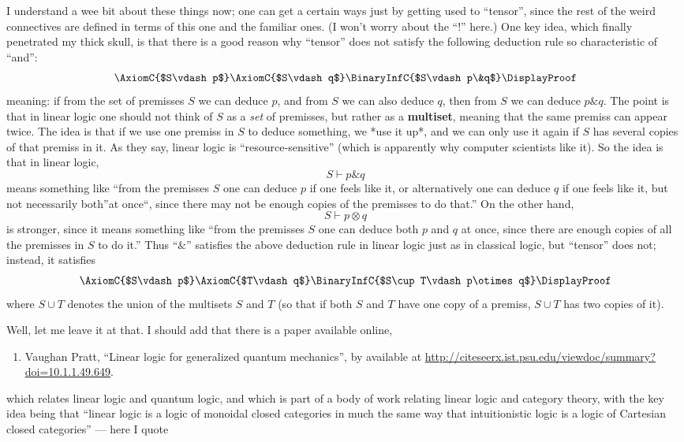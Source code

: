 \documentclass[12pt]{article}
\def\tightlist{}
\begin{document}
I understand a wee bit about these things now; one can get a certain
ways just by getting used to ``tensor'', since the rest of the weird
connectives are defined in terms of this one and the familiar ones. (I
won't worry about the ``\(!\)'' here.) One key idea, which finally
penetrated my thick skull, is that there is a good reason why ``tensor''
does not satisfy the following deduction rule so characteristic of
``and'':
\[\AxiomC{$S\vdash p$}\AxiomC{$S\vdash q$}\BinaryInfC{$S\vdash p\&q$}\DisplayProof\]
meaning: if from the set of premisses \(S\) we can deduce \(p\), and
from \(S\) we can also deduce \(q\), then from \(S\) we can deduce
\(p\&q\). The point is that in linear logic one should not think of
\(S\) as a \emph{set} of premisses, but rather as a \textbf{multiset},
meaning that the same premiss can appear twice. The idea is that if we
use one premiss in \(S\) to deduce something, we *use it up*, and we can
only use it again if \(S\) has several copies of that premiss in it. As
they say, linear logic is ``resource-sensitive'' (which is apparently
why computer scientists like it). So the idea is that in linear logic,
\[S\vdash p\&q\] means something like ``from the premisses \(S\) one can
deduce \(p\) if one feels like it, or alternatively one can deduce \(q\)
if one feels like it, but not necessarily both''at once``, since there
may not be enough copies of the premisses to do that.'' On the other
hand, \[S\vdash p\otimes q\] is stronger, since it means something like
``from the premisses \(S\) one can deduce both \(p\) and \(q\) at once,
since there are enough copies of all the premisses in \(S\) to do it.''
Thus ``\(\&\)'' satisfies the above deduction rule in linear logic just
as in classical logic, but ``tensor'' does not; instead, it satisfies
\[\AxiomC{$S\vdash p$}\AxiomC{$T\vdash q$}\BinaryInfC{$S\cup T\vdash p\otimes q$}\DisplayProof\]
where \(S \cup T\) denotes the union of the multisets \(S\) and \(T\)
(so that if both \(S\) and \(T\) have one copy of a premiss,
\(S \cup T\) has two copies of it).

Well, let me leave it at that. I should add that there is a paper
available online,

\begin{enumerate}
\def\labelenumi{\arabic{enumi})}
\setcounter{enumi}{1}
\tightlist
\item
 Vaughan Pratt, ``Linear logic for generalized quantum mechanics'', by 
  available at \href{http://citeseerx.ist.psu.edu/viewdoc/summary?doi=10.1.1.49.649}{http://citeseerx.ist.psu.edu/viewdoc/summary?doi=10.1.1.49.649}.
\end{enumerate}
\noindent
which relates linear logic and quantum logic, and which is part of a
body of work relating linear logic and category theory, with the key
idea being that ``linear logic is a logic of monoidal closed categories
in much the same way that intuitionistic logic is a logic of Cartesian
closed categories'' --- here I quote
\end{document}
